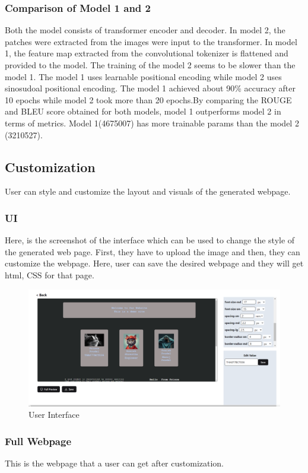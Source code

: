 \subsubsection{Comparison of Model 1 and 2}
Both the model consists of transformer encoder and decoder. In model 2, the patches were extracted from the images were input to the transformer. In model 1, the feature map extracted from the convolutional tokenizer is flattened and provided to the model. The training of the model 2 seems to be slower than the model 1. The model 1 uses learnable positional encoding while model 2 uses sinosudoal positional encoding. The model 1 achieved about 90\% accuracy after 10 epochs while model 2 took more than 20 epochs.By comparing the ROUGE and BLEU score obtained for both models, model 1 outperforms model 2 in terms of metrics. Model 1(4675007) has more trainable params than the model 2 (3210527).
\subsection{Customization}
User can style and customize the layout and visuals of the generated webpage.
\subsubsection{UI}
Here, is the screenshot of the interface which can be used to change the style of the 
generated web page. First, they have to upload the image and then, they can customize the webpage. Here, user can save the desired webpage and they will get html, CSS for that page.

\begin{figure}[H]
    \centering
           \includegraphics[scale=0.2]{images/user interface.png}
           \caption{User Interface}
           \label{fig:ui}
       \end{figure}
   

\subsubsection{Full Webpage}
This is the webpage that a user can get after customization.

